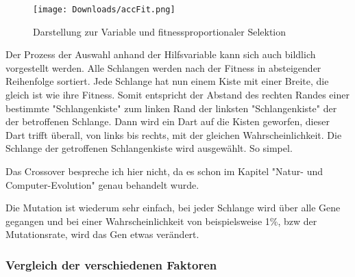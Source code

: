 \documentclass[11pt,a4paper,ngerman]{article}
\begin{document}
\begin{wrapfigure}{r}{0.5\textwidth} 
    \vspace{-20pt}
        \begin{center}
            \texttt{[image: Downloads/accFit.png]}
            \caption{Darstellung zur Variable  und fitnessproportionaler Selektion}
        \end{center}
    \vspace{-15pt}
\end{wrapfigure} 

Der Prozess der Auswahl anhand der Hilfsvariable  kann sich auch bildlich vorgestellt werden. Alle Schlangen werden nach der Fitness in absteigender Reihenfolge sortiert. Jede Schlange hat nun einem Kiste mit einer Breite, die gleich ist wie ihre Fitness. Somit entspricht der Abstand des rechten Randes einer bestimmte "Schlangenkiste" zum linken Rand der linksten "Schlangenkiste" der  der betroffenen Schlange. Dann wird ein Dart auf die Kisten geworfen, dieser Dart trifft überall, von links bis rechts, mit der gleichen Wahrscheinlichkeit. Die Schlange der getroffenen Schlangenkiste wird ausgewählt. So simpel.

\bigskip
Das Crossover bespreche ich hier nicht, da es schon im Kapitel "Natur- und Computer-Evolution" genau behandelt wurde.

\bigskip
Die Mutation ist wiederum sehr einfach, bei jeder Schlange wird über alle Gene gegangen und bei einer Wahrscheinlichkeit von beispielsweise 1\%, bzw der Mutationsrate, wird das Gen etwas verändert.

\subsubsection{Vergleich der verschiedenen Faktoren} \label{sec:FaktorenVergleich}
\end{document}
